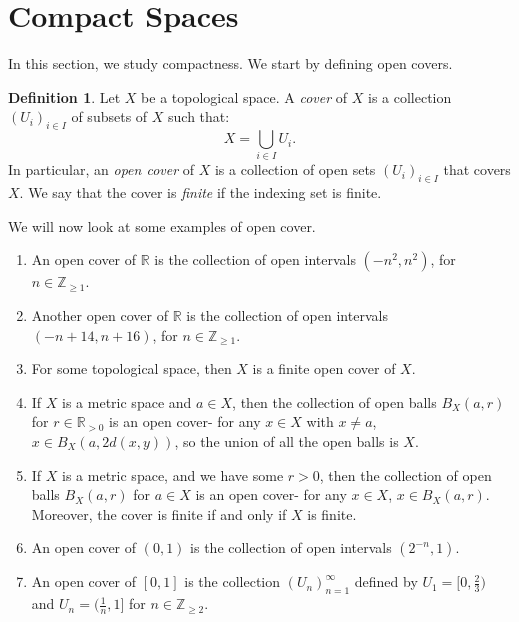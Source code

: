 \documentclass[a4paper, openany]{memoir}
\theoremstyle{definition}
\newtheorem{definition}{Definition}[section]
\theoremstyle{plain}
\begin{document}
\section{Compact Spaces}
In this section, we study compactness. We start by defining open covers.
\begin{definition}
Let $X$ be a topological space. A \emph{cover} of $X$ is a collection $(U_i)_{i \in I}$ of subsets of $X$ such that:
\[X = \bigcup_{i \in I} U_i.\]
In particular, an \emph{open cover} of $X$ is a collection of open sets $(U_i)_{i \in I}$ that covers $X$. We say that the cover is \emph{finite} if the indexing set is finite.
\end{definition}
\noindent We will now look at some examples of open cover.
\begin{enumerate}
    \item An open cover of $\mathbb{R}$ is the collection of open intervals $(-n^2, n^2)$, for $n \in \mathbb{Z}_{\geqslant 1}$. 
    
    \item Another open cover of $\mathbb{R}$ is the collection of open intervals $(-n+14, n+16)$, for $n \in \mathbb{Z}_{\geqslant 1}$.
    
    \item For some topological space, then $X$ is a finite open cover of $X$.
    
    \item If $X$ is a metric space and $a \in X$, then the collection of open balls $B_X(a, r)$ for $r \in \mathbb{R}_{> 0}$ is an open cover- for any $x \in X$ with $x \neq a$, $x \in B_X(a, 2d(x, y))$, so the union of all the open balls is $X$.
    
    \item If $X$ is a metric space, and we have some $r > 0$, then the collection of open balls $B_X(a, r)$ for $a \in X$ is an open cover- for any $x \in X$, $x \in B_X(a, r)$. Moreover, the cover is finite if and only if $X$ is finite.
    
    \item An open cover of $(0, 1)$ is the collection of open intervals $(2^{-n}, 1)$.
    
    \item An open cover of $[0, 1]$ is the collection $(U_n)_{n=1}^{\infty}$ defined by $U_1 = [0, \frac{2}{3})$ and $U_n = (\frac{1}{n}, 1]$ for $n \in \mathbb{Z}_{\geqslant 2}$.
\end{enumerate}
\end{document}
